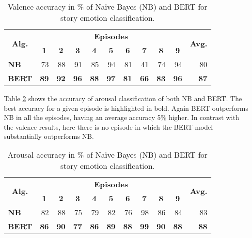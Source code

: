 \begin{table}[t!]
\centering
\setlength{\tabcolsep}{4pt}
\begin{tabular}{crrrrrrrrrr}
\toprule
\multirow{2}{*}{\textbf{Alg.}} & \multicolumn{9}{c}{\textbf{Episodes}} & \multirow{2}{*}{\textbf{Avg.}} \\
\cmidrule{2-10}
& \multicolumn{1}{c}{\textbf{1}}   & \multicolumn{1}{c}{\textbf{2}}   & \multicolumn{1}{c}{\textbf{3}}  & \multicolumn{1}{c}{\textbf{4}} & \multicolumn{1}{c}{\textbf{5}}  & \multicolumn{1}{c}{\textbf{6}}  & \multicolumn{1}{c}{\textbf{7}} & \multicolumn{1}{c}{\textbf{8}}  & \multicolumn{1}{c}{\textbf{9}} &    \\
\midrule
\multicolumn{1}{l}{\textbf{NB}}   &   73 & 88  &  91 & 85   &  94 & 81  &  41 & 74   & 94    &   80 \\
\multicolumn{1}{l}{\textbf{BERT}}   &  \textbf{89}  & \textbf{92}  & \textbf{96}  &  \textbf{88} & \textbf{97}   & \textbf{81} & \textbf{66}   &  \textbf{83}   &  \textbf{96} &  \textbf{87}  \\
\bottomrule
\end{tabular}
\caption{Valence accuracy in \% of Na\"ive Bayes (NB) and BERT for story emotion classification.}
\label{tab:valence}
\end{table}

Table \ref{tab:arousal} shows the accuracy of arousal classification of both NB and BERT. The best accuracy for a given episode is highlighted in bold. Again BERT outperforms NB in all the episodes, having an average accuracy 5\% higher. In contrast with the valence results, here there is no episode in which the BERT model substantially outperforms NB.

\begin{table}[h]
\centering
\setlength{\tabcolsep}{4pt}
\begin{tabular}{crrrrrrrrrr}
\toprule
\multirow{2}{*}{\textbf{Alg.}} & \multicolumn{9}{c}{\textbf{Episodes}} & \multirow{2}{*}{\textbf{Avg.}} \\
\cmidrule{2-10}
& \multicolumn{1}{c}{\textbf{1}}   & \multicolumn{1}{c}{\textbf{2}}   & \multicolumn{1}{c}{\textbf{3}}  & \multicolumn{1}{c}{\textbf{4}} & \multicolumn{1}{c}{\textbf{5}}  & \multicolumn{1}{c}{\textbf{6}}  & \multicolumn{1}{c}{\textbf{7}} & \multicolumn{1}{c}{\textbf{8}}  & \multicolumn{1}{c}{\textbf{9}} &    \\
\midrule
\multicolumn{1}{l}{\textbf{NB}}   &   82 & 88  &  75 & 79   &  82 & 76  &  98 & 86   & 84    &   83 \\
\multicolumn{1}{l}{\textbf{BERT}}   &  \textbf{86}  & \textbf{90}  & \textbf{77}  &  \textbf{86} & \textbf{89}   & \textbf{88} & \textbf{99}   &  \textbf{90}   &  \textbf{88} &  \textbf{88}  \\
\bottomrule
\end{tabular}
\caption{Arousal accuracy in \% of Na\"ive Bayes (NB) and BERT for story emotion classification.}
\label{tab:arousal}
\end{table}

